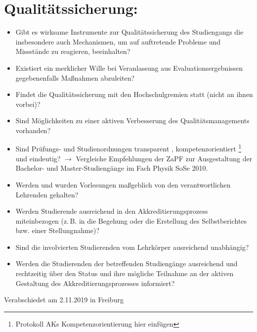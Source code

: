 \documentclass[DIV=calc]{scrartcl}
\begin{document}
	\section{Qualitätssicherung:}
	\begin{itemize}
		\item Gibt es wirksame Instrumente zur Qualitätssicherung des
		Studiengangs die insbesondere auch Mechanismen, um auf auftretende
		Probleme und Missstände zu reagieren, beeinhalten?
		\item Existiert ein merklicher Wille bei Veranlassung
		aus Evaluationsergebnissen gegebenenfalls Maßnahmen abzuleiten?
		\item Findet die Qualitätssicherung mit den Hochschulgremien statt
		(nicht an ihnen vorbei)?
		\item Sind Möglichkeiten zu einer aktiven Verbesserung des
			Qualitätsmanagements vorhanden?
		\item Sind Prüfungs- und Studienordnungen transparent ,
			kompetenzorientiert \footnote{Protokoll AKs Kompetenzorientierung hier einfügen} und eindeutig? $\rightarrow$ Vergleiche
		Empfehlungen der ZaPF zur Ausgestaltung der Bachelor- und
		Master-Studiengänge im Fach Physik SoSe
		2010.
		\item Werden und wurden Vorlesungen maßgeblich von den verantwortlichen
		Lehrenden gehalten?
		\item Werden Studierende ausreichend in den Akkreditierungsprozess
		miteinbezogen (z.\,B. in die Begehung oder die Erstellung des
		Selbstberichtes bzw. einer Stellungnahme)?
		\item Sind die involvierten Studierenden vom Lehrkörper ausreichend
		unabhängig?
		\item Werden die Studierenden der betreffenden Studiengänge ausreichend
		und rechtzeitig über den Status und ihre mögliche Teilnahme an der aktiven Gestaltung des
		Akkreditierungsprozesses informiert?
	\end{itemize}


	\pagebreak
	\renewcommand{\notesname}{Referenzen}
	\theendnotes

	\vspace*{\fill}
	\begin{flushright}
		Verabschiedet am 2.11.2019 in Freiburg
	\end{flushright}
\end{document}
